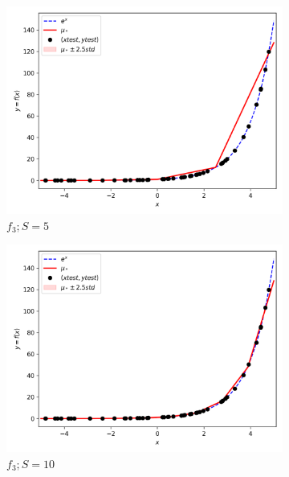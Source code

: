 \documentclass{article}
\begin{document}
\begin{figure}
\begin{subfigure}{.33\textwidth}
    \includegraphics[width=\linewidth]{test_size/func3_5.png}
    \caption{$f_3; S = 5$}
  \end{subfigure}
  \begin{subfigure}{.33\textwidth}
    \centering
    \includegraphics[width=\linewidth]{test_size/func3_10.png}
    \caption{$f_3; S = 10$}
  \end{subfigure}
  \begin{subfigure}{.33\textwidth}
    \centering

\end{subfigure}
\end{figure}
\end{document}

